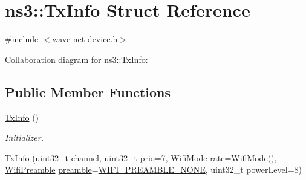 \hypertarget{structns3_1_1TxInfo}{}\section{ns3\+:\+:Tx\+Info Struct Reference}
\label{structns3_1_1TxInfo}


{\ttfamily \#include $<$wave-\/net-\/device.\+h$>$}



Collaboration diagram for ns3\+:\+:Tx\+Info\+:
\subsection*{Public Member Functions}
\begin{DoxyCompactItemize}
\item 
\hyperlink{structns3_1_1TxInfo_a41cbba129abf3a975ad024cbf6dd0f95}{Tx\+Info} ()
\begin{DoxyCompactList}\small\item\em Initializer. \end{DoxyCompactList}\item 
\hyperlink{structns3_1_1TxInfo_acd1024e3c1116eac5d5a6f8d4a462749}{Tx\+Info} (uint32\+\_\+t channel, uint32\+\_\+t prio=7, \hyperlink{classns3_1_1WifiMode}{Wifi\+Mode} rate=\hyperlink{classns3_1_1WifiMode}{Wifi\+Mode}(), \hyperlink{group__wifi_ga5e94a56cb338a14ffbbb19c6a41251eb}{Wifi\+Preamble} \hyperlink{structns3_1_1TxInfo_aea89775bfda7720ef893f10a4072dd76}{preamble}=\hyperlink{group__wifi_gga5e94a56cb338a14ffbbb19c6a41251eba97c5c71995de5f28931200e6d5a38a66}{W\+I\+F\+I\+\_\+\+P\+R\+E\+A\+M\+B\+L\+E\+\_\+\+N\+O\+NE}, uint32\+\_\+t power\+Level=8)
\end{DoxyCompactItemize}
